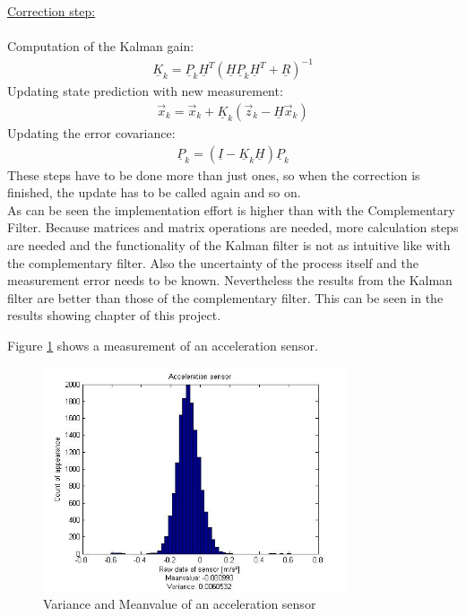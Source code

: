 \underline{Correction step:}\\\\
Computation of the Kalman gain:
\begin{align}
\underline{K}_k = \underline{P}_k	\underline{H}^T(\underline{H}\underline{P}_k\underline{H}^T+\underline{R})^{-1}
\label{equ:Kalman3}
\end{align}
Updating state prediction with new measurement:
\begin{align}
\vec x_k = 	\vec x_k+\underline{K}_k(\vec z_k-\underline{H}\vec x_k)
\label{equ:Kalman4}
\end{align}
Updating the error covariance:
\begin{align}
\underline{P}_k = (\underline{I}-\underline{K}_k\underline{H})\underline{P}_k	
\label{equ:Kalman5}
\end{align}
These steps have to be done more than just ones, so when the correction is finished, the update has to be called again and so on.\\
As can be seen the implementation effort is higher than with the Complementary Filter. Because matrices and matrix operations are needed, more calculation steps are needed and the functionality of the Kalman filter is not as intuitive like with the complementary filter. Also the uncertainty of the process itself and the measurement error needs to be known. Nevertheless the results from the Kalman filter are better than those of the complementary filter. This can be seen in the results showing chapter of this project.

Figure \ref{fig:measurement} shows a measurement of an acceleration sensor.
\begin{figure}[H]
	\centering\includegraphics[width=0.8\textwidth]{fig/Kal_Comp/AccX.jpg}
	\caption{Variance and Meanvalue of an acceleration sensor}
	\label{fig:measurement}
\end{figure}


